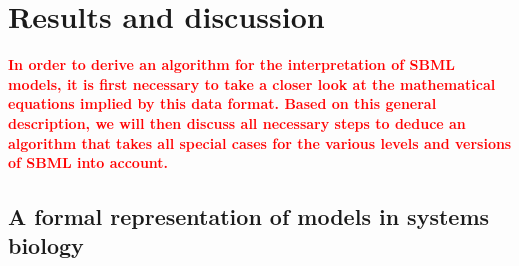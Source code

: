 \documentclass[10pt]{bmc_article}
\newenvironment{bmcformat}{\baselineskip20pt\sloppy\setboolean{publ}{false}}{\baselineskip20pt\sloppy}
\newcommand{\TODO}[1]{\textcolor{red}{\textbf{#1}}}
\begin{document}
\begin{bmcformat}
\section*{Results and discussion}

\TODO{In order to derive an algorithm for the interpretation of SBML models, it is first necessary to
take a closer look at the mathematical equations implied by this data format.
Based on this general description, we will then discuss all necessary steps
to deduce an algorithm that takes all special cases for the various levels and versions of SBML into account.}

\subsection*{A formal representation of models in systems biology}


\end{bmcformat}
\end{document}
